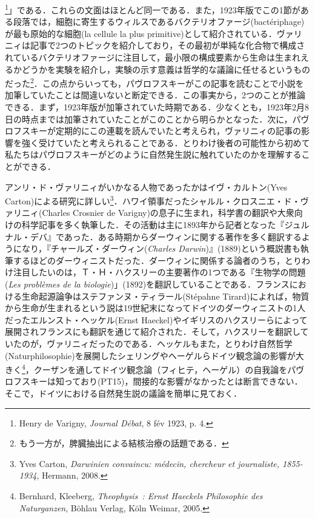 \footnote{Henry de Varigny, \emph{Journal Débat}, 8 fév 1923, p. 4.}」である．これらの文面はほとんど同一である．また，1923年版でこの1節がある段落では，細胞に寄生するウィルスであるバクテリオファージ(bactériphage)が最も原始的な細胞(la cellule la plus primitive)として紹介されている．ヴァリニィは記事で2つのトピックを紹介しており，その最初が単純な化合物で構成されているバクテリオファージに注目して，最小限の構成要素から生命は生まれえるかどうかを実験を紹介し，実験の示す意義は哲学的な議論に任せるというものだった\footnote{もう一方が，脾臓抽出による結核治療の話題である．}．この点からいっても，パヴロフスキーがこの記事を読むことで小説を加筆していたことは間違いないと断定できる．この事実から，2つのことが推論できる．まず，1923年版が加筆されていた時期である．少なくとも，1923年2月8日の時点までは加筆されていたことがこのことから明らかとなった．次に，パヴロフスキーが定期的にこの連載を読んでいたと考えられ，ヴァリニィの記事の影響を強く受けていたと考えられることである．とりわけ後者の可能性から初めて私たちはパヴロフスキーがどのように自然発生説に触れていたのかを理解することができる．

アンリ・ド・ヴァリニィがいかなる人物であったかはイヴ・カルトン(Yves Carton)による研究に詳しい\footnote{Yves Carton, \emph{Darwinien convaincu: médecin, chercheur et journaliste, 1855-1934}, Hermann, 2008.}．ハワイ領事だったシャルル・クロスニエ・ド・ヴァリニィ(Charles Crosnier de Varigny)の息子に生まれ，科学書の翻訳や大衆向けの科学記事を多く執筆した．その活動は主に1893年から記者となった『ジュルナル・デバ』であった．ある時期からダーウィンに関する著作を多く翻訳するようになり，『チャールズ・ダーウィン(\emph{Charles Darwin})』(1889)という概説書も執筆するほどのダーウィニストだった．ダーウィンに関係する論者のうち，とりわけ注目したいのは，Ｔ・Ｈ・ハクスリーの主要著作の1つである『生物学の問題(\emph{Les problèmes de la biologie})」(1892)を翻訳していることである．フランスにおける生命起源論争はステファンヌ・ティラール(Stépahne Tirard)によれば，物質から生命が生まれるという説は19世紀末になってドイツのダーウィニストの1人だったエルンスト・ヘッケル(Ernst Haeckel)やイギリスのハクスリーらによって展開されフランスにも翻訳を通じて紹介された．そして，ハクスリーを翻訳していたのが，ヴァリニィだったのである．ヘッケルもまた，とりわけ自然哲学(Naturphilosophie)を展開したシェリングやヘーゲルらドイツ観念論の影響が大きく\footnote{Bernhard, Kleeberg, \emph{Theophysis~: Ernst Haeckels Philosophie des Naturganzen}, Böhlau Verlag, Köln Weimar, 2005.}，クーザンを通してドイツ観念論（フィヒテ，ヘーゲル）の自我論をパヴロフスキーは知っており(PT15)，間接的な影響がなかったとは断言できない．そこで，ドイツにおける自然発生説の議論を簡単に見ておく．

